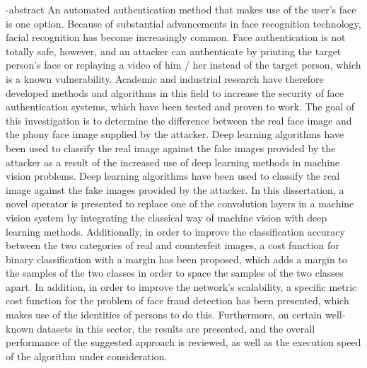


\en-abstract{
An automated authentication method that makes use of the user's face is one option. Because of substantial advancements in face recognition technology, facial recognition has become increasingly common. Face authentication is not totally safe, however, and an attacker can authenticate by printing the target person's face or replaying a video of him / her instead of the target person, which is a known vulnerability. Academic and industrial research have therefore developed methods and algorithms in this field to increase the security of face authentication systems, which have been tested and proven to work. The goal of this investigation is to determine the difference between the real face image and the phony face image supplied by the attacker. Deep learning algorithms have been used to classify the real image against the fake images provided by the attacker as a result of the increased use of deep learning methods in machine vision problems. Deep learning algorithms have been used to classify the real image against the fake images provided by the attacker. In this dissertation, a novel operator is presented to replace one of the convolution layers in a machine vision system by integrating the classical way of machine vision with deep learning methods. Additionally, in order to improve the classification accuracy between the two categories of real and counterfeit images, a cost function for binary classification with a margin has been proposed, which adds a margin to the samples of the two classes in order to space the samples of the two classes apart. In addition, in order to improve the network's scalability, a specific metric cost function for the problem of face fraud detection has been presented, which makes use of the identities of persons to do this. Furthermore, on certain well-known datasets in this sector, the results are presented, and the overall performance of the suggested approach is reviewed, as well as the execution speed of the algorithm under consideration.
}
